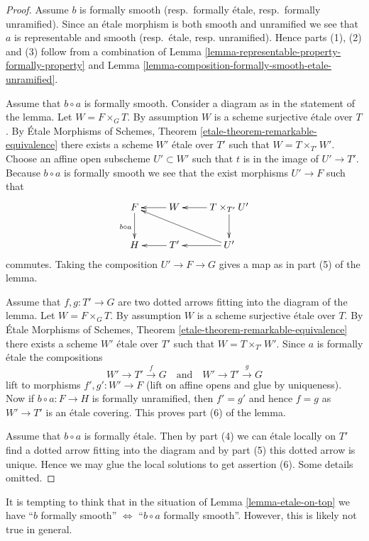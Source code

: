 \begin{proof}
Assume $b$ is formally smooth (resp.\ formally \'etale,
resp.\ formally unramified). Since an \'etale morphism is both
smooth and unramified we see that $a$ is representable and smooth
(resp.\ \'etale, resp. unramified). Hence parts (1), (2) and (3)
follow from a combination of
Lemma \ref{lemma-representable-property-formally-property}
and
Lemma \ref{lemma-composition-formally-smooth-etale-unramified}.

\medskip\noindent
Assume that $b \circ a$ is formally smooth. Consider a diagram
as in the statement of the lemma. Let $W = F \times_G T$.
By assumption $W$ is a scheme surjective \'etale over $T$. By
\'Etale Morphisms of Schemes, Theorem \ref{etale-theorem-remarkable-equivalence}
there exists a scheme $W'$ \'etale over $T'$ such that $W = T \times_{T'} W'$.
Choose an affine open subscheme $U' \subset W'$ such that $t$ is in
the image of $U' \to T'$. Because $b \circ a$ is formally
smooth we see that the exist morphisms $U' \to F$ such that
$$
\xymatrix{
F \ar[d]_{b \circ a} & W \ar[l] & T \times_{T'} U' \ar[d] \ar[l]\\
H & T' \ar[l] & U' \ar[llu] \ar[l]
}
$$
commutes. Taking the composition $U' \to F \to G$ gives a
map as in part (5) of the lemma.

\medskip\noindent
Assume that $f, g : T' \to G$ are two dotted arrows fitting into the
diagram of the lemma. Let $W = F \times_G T$.
By assumption $W$ is a scheme surjective \'etale over $T$. By
\'Etale Morphisms of Schemes, Theorem \ref{etale-theorem-remarkable-equivalence}
there exists a scheme $W'$ \'etale over $T'$ such that $W = T \times_{T'} W'$.
Since $a$ is formally \'etale the compositions
$$
W' \to T' \xrightarrow{f} G
\quad\text{and}\quad
W' \to T' \xrightarrow{g} G
$$
lift to morphisms $f', g' : W' \to F$ (lift on affine opens and glue by
uniqueness). Now if $b \circ a : F \to H$ is formally unramified, then
$f' = g'$ and hence $f = g$ as $W' \to T'$ is an \'etale covering. This proves
part (6) of the lemma.

\medskip\noindent
Assume that $b \circ a$ is formally \'etale. Then by part (4) we
can \'etale locally on $T'$ find a dotted arrow fitting into the diagram
and by part (5) this dotted arrow is unique. Hence we may glue the
local solutions to get assertion (6). Some details omitted.
\end{proof}

\begin{remark}
\label{remark-tempting}
It is tempting to think that in the situation of
Lemma \ref{lemma-etale-on-top}
we have
``$b$ formally smooth'' $\Leftrightarrow$ ``$b \circ a$ formally smooth''.
However, this is likely not true in general.
\end{remark}

